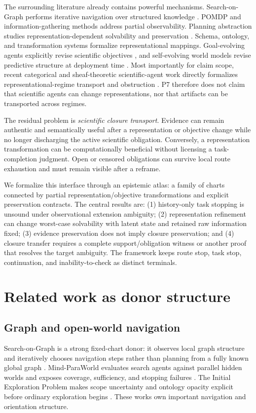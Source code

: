 \documentclass[11pt]{article}
\begin{document}
The surrounding literature already contains powerful mechanisms. Search-on-Graph performs iterative navigation over structured knowledge \cite{sog2025}. POMDP and information-gathering methods address partial observability. Planning abstraction studies representation-dependent solvability and preservation \cite{banihashemi2017,dong2025}. Schema, ontology, and transformation systems formalize representational mappings. Goal-evolving agents explicitly revise scientific objectives \cite{saga2025}, and self-evolving world models revise predictive structure at deployment time \cite{sewm2026}. Most importantly for claim scope, recent categorical and sheaf-theoretic scientific-agent work directly formalizes representational-regime transport and obstruction \cite{categorical2026,sheaf2026}. P7 therefore does not claim that scientific agents can change representations, nor that artifacts can be transported across regimes.

The residual problem is \emph{scientific closure transport}. Evidence can remain authentic and semantically useful after a representation or objective change while no longer discharging the active scientific obligation. Conversely, a representation transformation can be computationally beneficial without licensing a task-completion judgment. Open or censored obligations can survive local route exhaustion and must remain visible after a reframe.

We formalize this interface through an epistemic atlas: a family of charts connected by partial representation\slash objective transformations and explicit preservation contracts. The central results are: (1) history-only task stopping is unsound under observational extension ambiguity; (2) representation refinement can change worst-case solvability with latent state and retained raw information fixed; (3) evidence preservation does not imply closure preservation; and (4) closure transfer requires a complete support/obligation witness or another proof that resolves the target ambiguity. The framework keeps route stop, task stop, continuation, and inability-to-check as distinct terminals.

\section{Related work as donor structure}
\subsection{Graph and open-world navigation}
Search-on-Graph is a strong fixed-chart donor: it observes local graph structure and iteratively chooses navigation steps rather than planning from a fully known global graph \cite{sog2025}. Mind-ParaWorld evaluates search agents against parallel hidden worlds and exposes coverage, sufficiency, and stopping failures \cite{mpw2026}. The Initial Exploration Problem makes scope uncertainty and ontology opacity explicit before ordinary exploration begins \cite{iep2026}. These works own important navigation and orientation structure.
\end{document}
